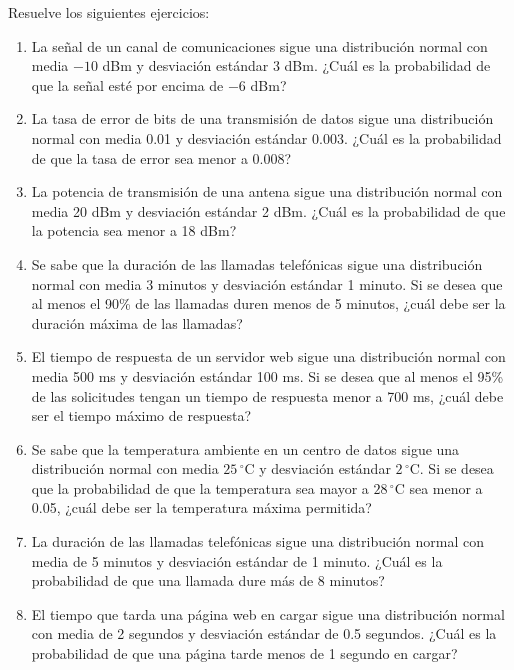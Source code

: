 \begin{Ejer}
Resuelve los siguientes ejercicios:
\begin{enumerate}

    \item La señal de un canal de comunicaciones sigue una distribución normal con media $-10$ dBm y desviación estándar 3 dBm. ¿Cuál es la probabilidad de que la señal esté por encima de $-6$ dBm?

    \item La tasa de error de bits de una transmisión de datos sigue una distribución normal con media 0.01 y desviación estándar 0.003. ¿Cuál es la probabilidad de que la tasa de error sea menor a 0.008?

    \item La potencia de transmisión de una antena sigue una distribución normal con media 20 dBm y desviación estándar 2 dBm. ¿Cuál es la probabilidad de que la potencia sea menor a 18 dBm?

    \item Se sabe que la duración de las llamadas telefónicas sigue una distribución normal con media 3 minutos y desviación estándar 1 minuto. Si se desea que al menos el 90\% de las llamadas duren menos de 5 minutos, ¿cuál debe ser la duración máxima de las llamadas?

    \item El tiempo de respuesta de un servidor web sigue una distribución normal con media 500 ms y desviación estándar 100 ms. Si se desea que al menos el 95\% de las solicitudes tengan un tiempo de respuesta menor a 700 ms, ¿cuál debe ser el tiempo máximo de respuesta?

    \item Se sabe que la temperatura ambiente en un centro de datos sigue una distribución normal con media $25\,^{\circ}\mathrm{C}$ y desviación estándar $2\,^{\circ}\mathrm{C}$. Si se desea que la probabilidad de que la temperatura sea mayor a $28\,^{\circ}\mathrm{C}$ sea menor a 0.05, ¿cuál debe ser la temperatura máxima permitida?

    \item La duración de las llamadas telefónicas sigue una distribución normal con media de 5 minutos y desviación estándar de 1 minuto. ¿Cuál es la probabilidad de que una llamada dure más de 8 minutos?

    \item El tiempo que tarda una página web en cargar sigue una distribución normal con media de 2 segundos y desviación estándar de 0.5 segundos. ¿Cuál es la probabilidad de que una página tarde menos de 1 segundo en cargar?


\end{enumerate}
\end{Ejer}
